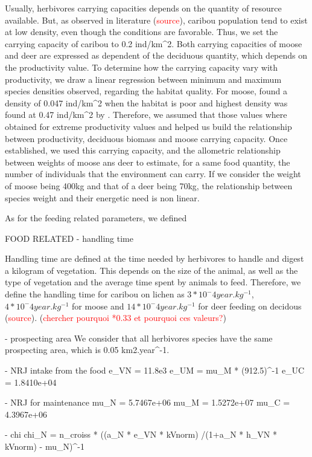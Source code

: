 Usually, herbivores carrying capacities depends on the quantity of resource available. But, as observed in literature (\textcolor{red}{source}), caribou population tend to exist at low density, even though the conditions are favorable. Thus, we set the carrying capacity of caribou to 0.2 ind/km^2. Both carrying capacities of moose and deer are expressed as dependent of the deciduous quantity, which depends on the productivity value. To determine how the carrying capacity vary with productivity, we draw a linear regression between minimum and maximum species densities observed, regarding the habitat quality. For moose, \cite{neufeld2021} found a density of 0.047 ind/km^2 when the habitat is poor and highest density was found at 0.47 ind/km^2 by \cite{johnson2019}. Therefore, we assumed that those values where obtained for extreme productivity values and helped us build the relationship between productivity, deciduous biomass and moose carrying capacity. Once established, we used this carrying capacity, and the allometric relationship between weights of moose ans deer to estimate, for a same food quantity, the number of individuals that the environment can carry. If we consider the weight of moose being 400kg and that of a deer being 70kg, the relationship between species weight and their energetic need is non linear. 

As for the feeding related parameters, we defined 

FOOD RELATED
- handling time 

Handling time are defined at the time needed by herbivores to handle and digest a kilogram of vegetation. This depends on the size of the animal, as well as the type of vegetation and the average time spent by animals to feed. Therefore, we define the handling time for caribou on lichen as $3*10^-4 year.kg^{-1}$, $4*10^-4 year.kg^{-1}$ for moose and $14*10^-4 year.kg^{-1}$ for deer feeding on decidous (\textcolor{red}{source}). 
(\textcolor{red}{chercher pourquoi *0.33 et pourquoi ces valeurs?})

- prospecting area
We consider that all herbivores species have the same prospecting area, which is 0.05 km2.year^{-1}. 

- NRJ intake from the food
e_VN = 11.8e3
e_UM = mu_M * (912.5)^-1
e_UC = 1.8410e+04

- NRJ for maintenance
mu_N = 5.7467e+06
mu_M = 1.5272e+07
mu_C =  4.3967e+06

- chi
chi_N = n_croiss * ((a_N * e_VN * kVnorm)
                    /(1+a_N * h_VN * kVnorm) - mu_N)^-1






